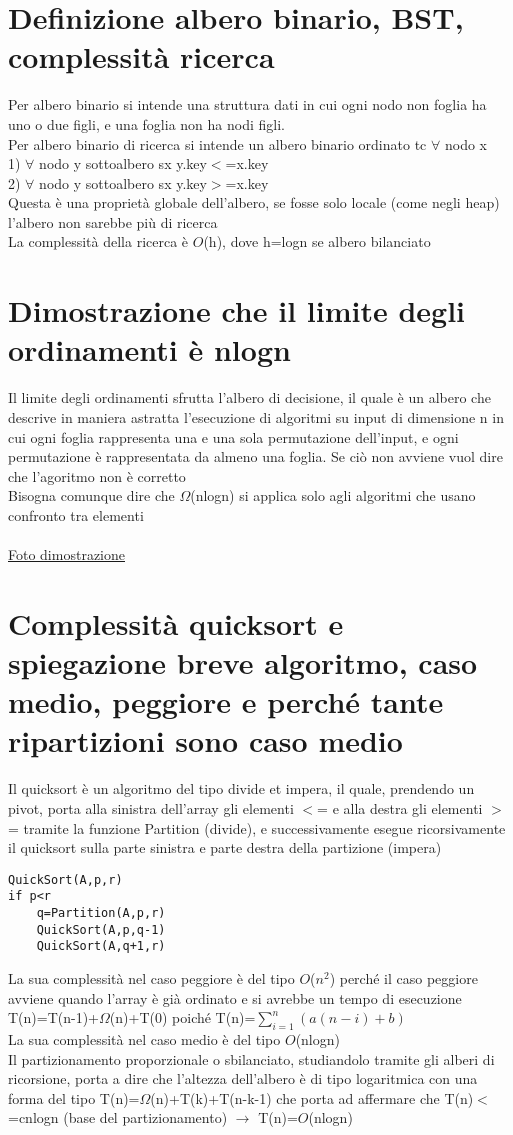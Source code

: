 \documentclass[12pt,oneside,a4paper]{article}
\newcommand\Omicron{O}
\begin{document}
\section{Definizione albero binario, BST, complessità ricerca}
Per albero binario si intende una struttura dati in cui ogni nodo non foglia ha uno o due figli, e una foglia non ha nodi figli.\\
Per albero binario di ricerca si intende un albero binario ordinato tc $\forall$ nodo x\\
1) $\forall$ nodo y sottoalbero sx y.key$<$=x.key \\
2) $\forall$ nodo y sottoalbero sx y.key$>$=x.key \\
Questa è una proprietà globale dell'albero, se fosse solo locale (come negli heap) l'albero non sarebbe più di ricerca\\
La complessità della ricerca è $\Omicron$(h), dove h=logn se albero bilanciato
\section{Dimostrazione che il limite degli ordinamenti è nlogn}
Il limite degli ordinamenti sfrutta l'albero di decisione, il quale è un albero che descrive in maniera astratta l'esecuzione di algoritmi su input di dimensione n in cui ogni foglia rappresenta una e una sola permutazione dell'input, e ogni permutazione è rappresentata da almeno una foglia. Se ciò non avviene vuol dire che l'agoritmo non è corretto\\
Bisogna comunque dire che $\Omega$(nlogn) si applica solo agli algoritmi che usano confronto tra elementi\\\\
\href{alberodecisione.pdf}{Foto dimostrazione}
\section{Complessità quicksort e spiegazione breve algoritmo, caso medio, peggiore e perché tante ripartizioni sono caso medio}
Il quicksort è un algoritmo del tipo divide et impera, il quale, prendendo un pivot, porta alla sinistra dell'array gli elementi $<$= e alla destra gli elementi $>$= tramite la funzione Partition (divide), e successivamente esegue ricorsivamente il quicksort sulla parte sinistra e parte destra della partizione (impera)\\
\begin{lstlisting}[style=pseudocodice]
QuickSort(A,p,r)
if p<r
	q=Partition(A,p,r)
	QuickSort(A,p,q-1)
	QuickSort(A,q+1,r)
\end{lstlisting}
La sua complessità nel caso peggiore è del tipo $\Omicron$($n^2$) perché il caso peggiore avviene quando l'array è già ordinato e si avrebbe un tempo di esecuzione T(n)=T(n-1)+$\Omega$(n)+T(0) poiché T(n)=$\sum_{i=1}^n (a(n-i)+b)$ \\
La sua complessità nel caso medio è del tipo $\Omicron$(nlogn)\\
Il partizionamento proporzionale o sbilanciato, studiandolo tramite gli alberi di ricorsione, porta a dire che l'altezza dell'albero è di tipo logaritmica con una forma del tipo T(n)=$\Omega$(n)+T(k)+T(n-k-1) che porta ad affermare che T(n)$<$=cnlogn (base del partizionamento) $\to$ T(n)=$\Omicron$(nlogn)
\end{document}
